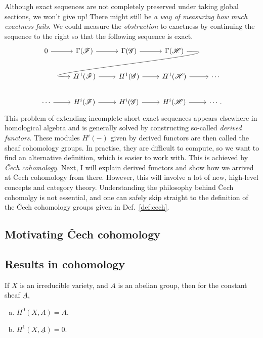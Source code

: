 Although exact sequences are not completely preserved under taking
global sections, we won't give up! There might still be \emph{a way of
measuring how much exactness fails}. We could measure the
\emph{obstruction} to exactness by continuing the sequence to the right
so that the following sequence is exact.
\[
\begin{tikzcd}
  0 \arrow{r} & \Gamma(\mathscr{F}) \arrow{r} & \Gamma(\mathscr{G})
  \arrow{r} & \Gamma(\mathscr{H})
  \arrow[out=0, in=180, looseness=1.5, overlay]{dll} & \\
    & H^{1}(\mathscr{F}) \arrow{r} & H^{1}(\mathscr{G})
  \arrow{r} & H^{1}(\mathscr{H}) \arrow{r} & \cdots \\
  \cdots \arrow{r}& H^{i}(\mathscr{F}) \arrow{r} & H^{i}(\mathscr{G})
  \arrow{r} & H^{i}(\mathscr{H}) \arrow{r} & \cdots.
\end{tikzcd}
\]
This problem of extending incomplete short exact sequences appears
elsewhere in homological algebra and is generally solved by constructing
so-called \emph{derived functors}. These modules $H^{i}(-)$ given by derived
functors are then called the sheaf cohomology groups. In practise, they are
difficult to compute, so we want to find an alternative definition,
which is easier to work with. This is achieved by \emph{\v Cech cohomology}.
Next, I will explain derived functors and show how we arrived at \v Cech
cohomology from there. However, this will involve a lot of new, high-level
concepts and category theory. Understanding the philosophy behind
\v Cech cohomolgy is not essential, and one can safely skip straight to the
definition of the \v Cech cohomology groups given in Def.~\ref{def:cech}.

\subsection{Motivating \v Cech cohomology}


\subsection{Results in cohomology}

\begin{prop}\label{prop:const_sheaf}
  If $X$ is an irreducible variety, and $A$ is an abelian group,
  then for the constant sheaf $\underline{A}$,
  \begin{enumerate}[(a)]
    \item $H^{0}(X,\underline{A}) = A$,
    \item $H^{1}(X,\underline{A})=0$.
  \end{enumerate}
\end{prop}
